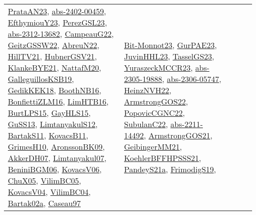 {\begin{longtable}{lp{3cm}>{\raggedright}p{6cm}>{\raggedright}p{6cm}p{8cm}}
\href{articles/PrataAN23.pdf}{PrataAN23}\cite{PrataAN23}, \href{articles/abs-2402-00459.pdf}{abs-2402-00459}\cite{abs-2402-00459}, \href{papers/EfthymiouY23.pdf}{EfthymiouY23}\cite{EfthymiouY23}, \href{papers/PerezGSL23.pdf}{PerezGSL23}\cite{PerezGSL23}, \href{articles/abs-2312-13682.pdf}{abs-2312-13682}\cite{abs-2312-13682}, \href{articles/CampeauG22.pdf}{CampeauG22}\cite{CampeauG22}, \href{papers/GeitzGSSW22.pdf}{GeitzGSSW22}\cite{GeitzGSSW22}, \href{articles/AbreuN22.pdf}{AbreuN22}\cite{AbreuN22}, \href{papers/HillTV21.pdf}{HillTV21}\cite{HillTV21}, \href{articles/HubnerGSV21.pdf}{HubnerGSV21}\cite{HubnerGSV21}, \href{papers/KlankeBYE21.pdf}{KlankeBYE21}\cite{KlankeBYE21}, \href{papers/NattafM20.pdf}{NattafM20}\cite{NattafM20}, \href{papers/GalleguillosKSB19.pdf}{GalleguillosKSB19}\cite{GalleguillosKSB19}, \href{articles/GedikKEK18.pdf}{GedikKEK18}\cite{GedikKEK18}, \href{papers/BoothNB16.pdf}{BoothNB16}\cite{BoothNB16}, \href{papers/BonfiettiZLM16.pdf}{BonfiettiZLM16}\cite{BonfiettiZLM16}, \href{papers/LimHTB16.pdf}{LimHTB16}\cite{LimHTB16}, \href{papers/BurtLPS15.pdf}{BurtLPS15}\cite{BurtLPS15}, \href{papers/GayHLS15.pdf}{GayHLS15}\cite{GayHLS15}, \href{papers/GuSS13.pdf}{GuSS13}\cite{GuSS13}, \href{articles/LimtanyakulS12.pdf}{LimtanyakulS12}\cite{LimtanyakulS12}, \href{articles/BartakS11.pdf}{BartakS11}\cite{BartakS11}, \href{articles/KovacsB11.pdf}{KovacsB11}\cite{KovacsB11}, \href{papers/GrimesH10.pdf}{GrimesH10}\cite{GrimesH10}, \href{papers/AronssonBK09.pdf}{AronssonBK09}\cite{AronssonBK09}, \href{papers/AkkerDH07.pdf}{AkkerDH07}\cite{AkkerDH07}, \href{papers/Limtanyakul07.pdf}{Limtanyakul07}\cite{Limtanyakul07}, \href{papers/BeniniBGM06.pdf}{BeniniBGM06}\cite{BeniniBGM06}, \href{papers/KovacsV06.pdf}{KovacsV06}\cite{KovacsV06}, \href{papers/ChuX05.pdf}{ChuX05}\cite{ChuX05}, \href{articles/VilimBC05.pdf}{VilimBC05}\cite{VilimBC05}, \href{papers/KovacsV04.pdf}{KovacsV04}\cite{KovacsV04}, \href{papers/VilimBC04.pdf}{VilimBC04}\cite{VilimBC04}, \href{papers/Bartak02a.pdf}{Bartak02a}\cite{Bartak02a}, \href{papers/Caseau97.pdf}{Caseau97}\cite{Caseau97} & \href{papers/Bit-Monnot23.pdf}{Bit-Monnot23}\cite{Bit-Monnot23}, \href{articles/GurPAE23.pdf}{GurPAE23}\cite{GurPAE23}, \href{papers/JuvinHHL23.pdf}{JuvinHHL23}\cite{JuvinHHL23}, \href{papers/TasselGS23.pdf}{TasselGS23}\cite{TasselGS23}, \href{articles/YuraszeckMCCR23.pdf}{YuraszeckMCCR23}\cite{YuraszeckMCCR23}, \href{articles/abs-2305-19888.pdf}{abs-2305-19888}\cite{abs-2305-19888}, \href{articles/abs-2306-05747.pdf}{abs-2306-05747}\cite{abs-2306-05747}, \href{articles/HeinzNVH22.pdf}{HeinzNVH22}\cite{HeinzNVH22}, \href{papers/ArmstrongGOS22.pdf}{ArmstrongGOS22}\cite{ArmstrongGOS22}, \href{papers/PopovicCGNC22.pdf}{PopovicCGNC22}\cite{PopovicCGNC22}, \href{articles/SubulanC22.pdf}{SubulanC22}\cite{SubulanC22}, \href{articles/abs-2211-14492.pdf}{abs-2211-14492}\cite{abs-2211-14492}, \href{papers/ArmstrongGOS21.pdf}{ArmstrongGOS21}\cite{ArmstrongGOS21}, \href{papers/GeibingerMM21.pdf}{GeibingerMM21}\cite{GeibingerMM21}, \href{articles/KoehlerBFFHPSSS21.pdf}{KoehlerBFFHPSSS21}\cite{KoehlerBFFHPSSS21}, \href{articles/PandeyS21a.pdf}{PandeyS21a}\cite{PandeyS21a}, \href{papers/FrimodigS19.pdf}{FrimodigS19}\cite{FrimodigS19}, 
\end{longtable}}

